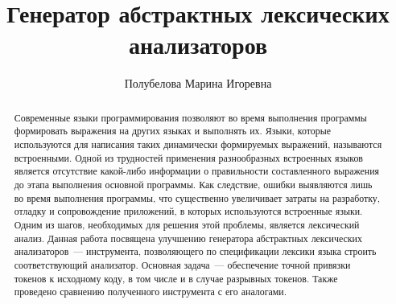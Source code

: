 %

\title{Генератор абстрактных лексических анализаторов}
%

\author{Полубелова Марина Игоревна}
%
%
%

\maketitle              %

\begin{abstract}
Современные языки программирования позволяют во время выполнения программы формировать выражения на других языках и выполнять их. 
Языки, которые используются для написания таких динамически формируемых выражений, называются встроенными. Одной из трудностей 
применения разнообразных встроенных языков является отсутствие какой-либо информации о правильности составленного выражения до 
этапа выполнения основной программы. Как следствие, ошибки выявляются лишь во время выполнения программы, что существенно увеличивает 
затраты на разработку, отладку и сопровождение приложений, в которых используются встроенные языки. Одним из шагов, необходимых для 
решения этой проблемы, является лексический анализ. Данная работа посвящена улучшению генератора абстрактных лексических анализаторов~---
инструмента, позволяющего по спецификации лексики языка строить соответствующий анализатор. Основная задача~--- обеспечение точной привязки 
токенов к исходному коду, в том числе и в случае разрывных токенов. Также проведено сравнению полученного инструмента с его аналогами.
\end{abstract}

